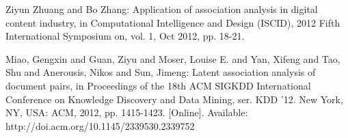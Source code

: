 \documentclass{llncs}
\begin{document}
\begin{thebibliography}{15}
 Ziyun Zhuang and Bo Zhang: Application of association analysis in digital content industry, in Computational Intelligence and Design (ISCID), 2012 Fifth International Symposium on, vol. 1, Oct 2012, pp. 18-21.

 Miao, Gengxin and Guan, Ziyu and Moser, Louise E. and Yan, Xifeng and Tao, Shu and Anerousis, Nikos and Sun, Jimeng: Latent association analysis of document pairs, in Proceedings of the 18th ACM SIGKDD International Conference on Knowledge Discovery and Data Mining, ser. KDD '12. New York, NY, USA: ACM, 2012, pp. 1415-1423. [Online]. Available: http://doi.acm.org/10.1145/2339530.2339752

\end{thebibliography}
%
\end{document}
